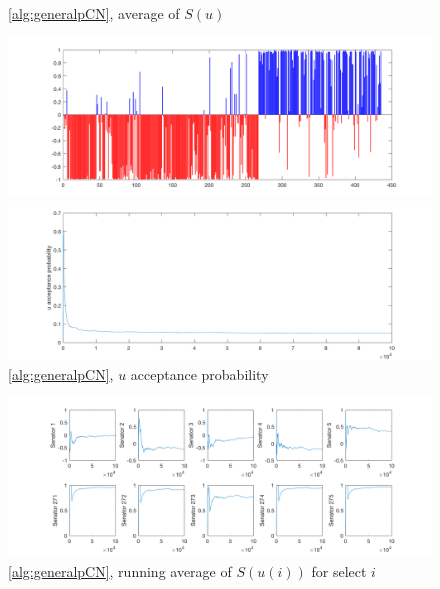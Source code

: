 \documentclass{siamart1116}
\begin{document}
            \begin{figure}[!htb]
            \begin{minipage}{0.48\textwidth}
                \centering
                \caption{\label{fig:voting_nonhier_u_avg} \cref{alg:generalpCN}, average of $S(u)$}
                \includegraphics[width=\linewidth]{learnM/voting/nonhier/u_avg.png}
            \end{minipage} \hfill
            \begin{minipage}{0.48\textwidth}
                \centering
                \caption{\label{fig:voting_nonhier_u_accept} \cref{alg:generalpCN}, $u$ acceptance probability}
                \includegraphics[width=\linewidth]{learnM/voting/nonhier/u_accept.png}
            \end{minipage}
            \end{figure}

            \begin{figure}[!htb]
            \centering
            \caption{\label{fig:voting_nonhier_senator_traces} \cref{alg:generalpCN}, running average of $S(u(i))$ for select $i$}
            \includegraphics[width=0.8\linewidth]{learnM/voting/nonhier/senator_traces.png}
            \end{figure}
\end{document}
